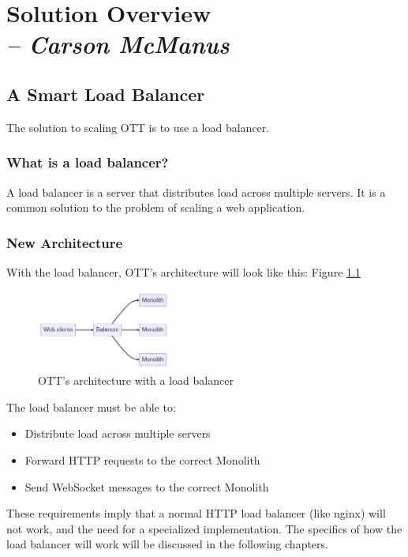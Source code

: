 \chapter{Solution Overview \\
  \small{\textit{-- Carson McManus}}
  \label{Chapter::SolutionOverview}}

\section{A Smart Load Balancer}

The solution to scaling OTT is to use a load balancer.

\subsection{What is a load balancer?}

A load balancer is a server that distributes load across multiple servers. It is a common solution to the problem of scaling a web application.

\subsection{New Architecture}

With the load balancer, OTT's architecture will look like this: Figure \ref{fig:ott-architecture-with-load-balancer}

\begin{figure}[!h]
  \centering
  \includegraphics[width=0.4\textwidth]{Figures/ott-architecture-with-load-balancer.png}
  \caption{OTT's architecture with a load balancer}
  \label{fig:ott-architecture-with-load-balancer}
\end{figure}

The load balancer must be able to:
\begin{itemize}
  \item Distribute load across multiple servers
  \item Forward HTTP requests to the correct Monolith
  \item Send WebSocket messages to the correct Monolith
\end{itemize}

These requirements imply that a normal HTTP load balancer (like nginx) will not work, and the need for a specialized implementation. The specifics of how the load balancer will work will be discussed in the following chapters.
